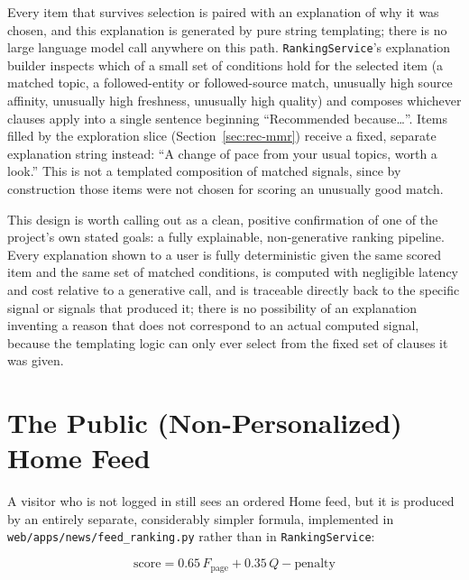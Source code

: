 Every item that survives selection is paired with an explanation of why it was chosen, and this explanation is generated by pure string templating; there is no large language model call anywhere on this path. \texttt{RankingService}'s explanation builder inspects which of a small set of conditions hold for the selected item (a matched topic, a followed-entity or followed-source match, unusually high source affinity, unusually high freshness, unusually high quality) and composes whichever clauses apply into a single sentence beginning ``Recommended because\ldots''. Items filled by the exploration slice (Section~\ref{sec:rec-mmr}) receive a fixed, separate explanation string instead: ``A change of pace from your usual topics, worth a look.'' This is not a templated composition of matched signals, since by construction those items were not chosen for scoring an unusually good match.

This design is worth calling out as a clean, positive confirmation of one of the project's own stated goals: a fully explainable, non-generative ranking pipeline. Every explanation shown to a user is fully deterministic given the same scored item and the same set of matched conditions, is computed with negligible latency and cost relative to a generative call, and is traceable directly back to the specific signal or signals that produced it; there is no possibility of an explanation inventing a reason that does not correspond to an actual computed signal, because the templating logic can only ever select from the fixed set of clauses it was given.

\section{The Public (Non-Personalized) Home Feed}
\label{sec:rec-public-feed}

A visitor who is not logged in still sees an ordered Home feed, but it is produced by an entirely separate, considerably simpler formula, implemented in \texttt{web/apps/news/feed\_ranking.py} rather than in \texttt{RankingService}:

\begin{equation}
\text{score} = 0.65\,F_{\text{page}} + 0.35\,Q - \text{penalty}
\label{eq:public-feed}
\end{equation}

